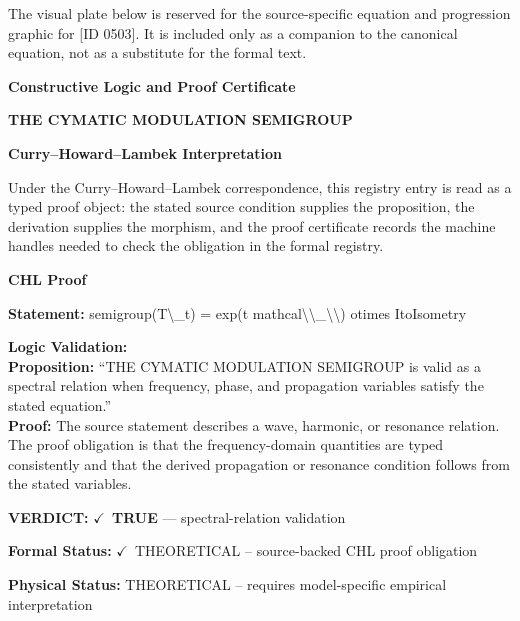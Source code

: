 \begingroup\footnotesize\sloppy
The visual plate below is reserved for the source-specific equation and progression graphic for [ID 0503]. It is included only as a companion to the canonical equation, not as a substitute for the formal text.
\par\endgroup
\ifTZPDarkEdition
{}
\fi

\clearpage
\begingroup\tzpsupportsetup
\noindent\textbf{\fontsize{10.8pt}{12.8pt}\selectfont [ID 0503] Constructive Logic and Proof Certificate}\par
\noindent\textbf{\fontsize{10pt}{12pt}\selectfont THE CYMATIC MODULATION SEMIGROUP}\par
\vspace{0.45em}
\begingroup
\footnotesize
\setlength{\parskip}{0.22em}
\setlength{\parindent}{0pt}
\noindent\textbf{Curry--Howard--Lambek Interpretation}\par
Under the Curry--Howard--Lambek correspondence, this registry entry is read as a typed proof
object: the stated source condition supplies the proposition, the derivation supplies the
morphism, and the proof certificate records the machine handles needed to check the obligation
in the formal registry.

\vspace{0.45em}
\noindent\textbf{CHL Proof}\par
\textbf{Statement:} semigroup(T\textbackslash{}\_t) = exp(t mathcal\textbackslash{}\textbackslash{}\_\textbackslash{}\textbackslash{}) otimes ItoIsometry

\textbf{Logic Validation:}\\
\textbf{Proposition:} ``THE CYMATIC MODULATION SEMIGROUP is valid as a spectral relation when frequency, phase,
and propagation variables satisfy the stated equation.''\\
\textbf{Proof:} The source statement describes a wave, harmonic, or resonance relation. The proof
obligation is that the frequency-domain quantities are typed consistently and that the
derived propagation or resonance condition follows from the stated variables.

\textbf{VERDICT:} \ensuremath{\checkmark}\ \textbf{TRUE} --- spectral-relation validation

\textbf{Formal Status:} \ensuremath{\checkmark}\ THEORETICAL -- source-backed CHL proof obligation

\textbf{Physical Status:} THEORETICAL -- requires model-specific empirical interpretation
\par\vspace{0.45em}
\par
\ifTZPDarkEdition
{}
\fi
\endgroup
\endgroup
